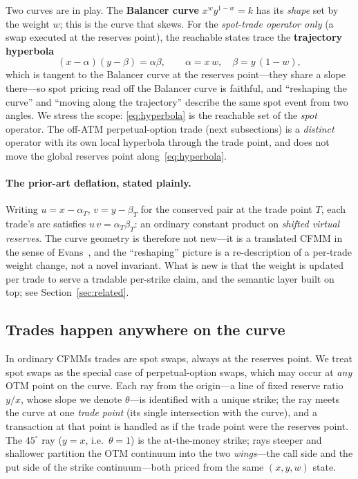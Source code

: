 \documentclass[11pt]{article}
\begin{document}
Two curves are in play. The \textbf{Balancer curve} $x^{w}y^{1-w}=k$ has its
\emph{shape} set by the weight $w$; this is the curve that skews. For the
\emph{spot-trade operator only} (a swap executed at the reserves point), the
reachable states trace the \textbf{trajectory hyperbola}
\begin{equation}
  (x-\alpha)(y-\beta)=\alpha\beta,\qquad \alpha=x\,w,\quad \beta=y\,(1-w),
  \label{eq:hyperbola}
\end{equation}
which is tangent to the Balancer curve at the reserves point---they share a slope
there---so spot pricing read off the Balancer curve is faithful, and ``reshaping
the curve'' and ``moving along the trajectory'' describe the same spot event from
two angles. We stress the scope: \eqref{eq:hyperbola} is the reachable set of the
\emph{spot} operator. The off-ATM perpetual-option trade (next subsections) is a
\emph{distinct} operator with its own local hyperbola through the trade point, and
does not move the global reserves point along~\eqref{eq:hyperbola}.

\paragraph{The prior-art deflation, stated plainly.}
Writing $u=x-\alpha_T$, $v=y-\beta_T$ for the conserved pair at the trade point
$T$, each trade's arc satisfies $u\,v=\alpha_T\beta_T$: an ordinary constant
product on \emph{shifted virtual reserves}. The curve geometry is therefore not
new---it is a translated CFMM in the sense of Evans~\cite{evans2020}, and the
``reshaping'' picture is a re-description of a per-trade weight change, not a
novel invariant. What is new is that the weight is updated per trade to serve a
tradable per-strike claim, and the semantic layer built on top; see
Section~\ref{sec:related}.

\subsection{Trades happen anywhere on the curve}
In ordinary CFMMs trades are spot swaps, always at the reserves point. We treat
spot swaps as the special case of perpetual-option swaps, which may occur at
\emph{any} OTM point on the curve. Each ray from the origin---a line of fixed
reserve ratio $y/x$, whose slope we denote $\theta$---is identified with a unique
strike; the ray meets the curve at one \emph{trade point} (its single intersection
with the curve), and a transaction at that point is handled as if the trade point
were the reserves point. The $45^{\circ}$ ray ($y=x$, i.e.\ $\theta=1$) is the
at-the-money strike; rays steeper and shallower partition the OTM continuum into
the two \emph{wings}---the call side and the put side of the strike continuum---both
priced from the same $(x,y,w)$ state.
\end{document}
